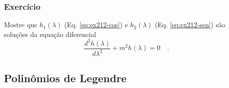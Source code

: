 \documentclass[10pt,a4paper,fleqn]{article}
\begin{document}
\begin{flushleft}
\dotfill
\end{flushleft}

\subsubsection{Exerc\'{i}cio}

Mostre que
$h_{1}(\lambda)$ (Eq. \ref{eq:ex212-cos}) e $h_{2}(\lambda)$ (Eq. \ref{eq:ex212-sen}) 
s\~{a}o soluç\~{o}es da equaç\~{a}o diferencial
\begin{equation}
\frac{d^{2} h(\lambda)}{d \lambda^{2}} + m^{2} h(\lambda) = 0 \quad .
\label{eq:ex212-eqdif-lamb}
\end{equation}

\begin{flushleft}
\dotfill
\end{flushleft}

\subsection{Polin\^{o}mios de Legendre}
\end{document}
